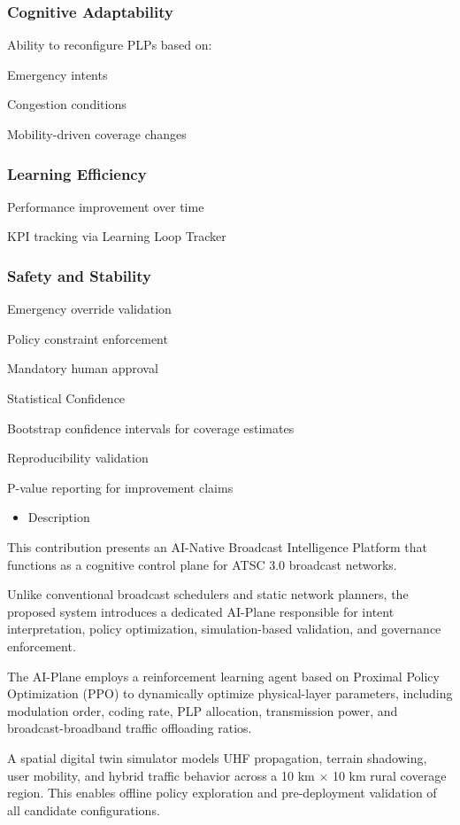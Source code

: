 \documentclass{article}
\begin{document}
\subsubsection{Cognitive Adaptability}
Ability to reconfigure PLPs based on:

Emergency intents

Congestion conditions

Mobility-driven coverage changes

\subsubsection{Learning Efficiency}
Performance improvement over time

KPI tracking via Learning Loop Tracker

\subsubsection{Safety and Stability}
Emergency override validation

Policy constraint enforcement

Mandatory human approval

Statistical Confidence

Bootstrap confidence intervals for coverage estimates

Reproducibility validation

P-value reporting for improvement claims

\begin{itemize}
  \item Description
\end{itemize}
This contribution presents an AI-Native Broadcast Intelligence Platform that functions as a cognitive control plane for ATSC 3.0 broadcast networks.

Unlike conventional broadcast schedulers and static network planners, the proposed system introduces a dedicated AI-Plane responsible for intent interpretation, policy optimization, simulation-based validation, and governance enforcement.

The AI-Plane employs a reinforcement learning agent based on Proximal Policy Optimization (PPO) to dynamically optimize physical-layer parameters, including modulation order, coding rate, PLP allocation, transmission power, and broadcast-broadband traffic offloading ratios.

A spatial digital twin simulator models UHF propagation, terrain shadowing, user mobility, and hybrid traffic behavior across a 10 km × 10 km rural coverage region. This enables offline policy exploration and pre-deployment validation of all candidate configurations.
\end{document}
